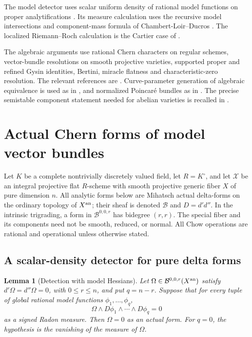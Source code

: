 \documentclass[11pt]{article}
\newtheorem{lemma}[theorem]{Lemma}
\theoremstyle{definition}
\theoremstyle{remark}
\numberwithin{equation}{section}
\begin{document}
The model detector uses scalar uniform density of rational model functions on proper analytifications \cite[Proposition 2.15]{GM}. Its measure calculation uses the recursive model intersections and component-mass formula of Chambert-Loir--Ducros \cite[Sections 8.7--8.8 and Theorem 18.5.5]{CLD}. The localized Riemann--Roch calculation is the Cartier case of \cite[Corollary 18.1.2]{Fulton}.

The algebraic arguments use rational Chern characters on regular schemes, vector-bundle resolutions on smooth projective varieties, supported proper and refined Gysin identities, Bertini, miracle flatness and characteristic-zero resolution. The relevant references are \cite{Stacks,StacksFEY,StacksFEW,StacksGysin}. Curve-parameter generation of algebraic equivalence is used as in \cite{ACMV}, and normalized Poincar\'e bundles as in \cite{MilneJV}. The precise semistable component statement needed for abelian varieties is recalled in .


\section{Actual Chern forms of model vector bundles}
\label{r10c:section}

Let $K$ be a complete nontrivially discretely valued field, let
$R=K^\circ$, and let $\mathcal X$ be an integral projective flat
$R$-scheme with smooth projective generic fiber $X$ of pure dimension $n$.
All analytic forms below are Mihatsch actual delta-forms on the ordinary
topology of $X^{\rm an}$; their sheaf is denoted $\mathcal B$ and
$D=d'd''$.  In the intrinsic trigrading, a form in
$\mathcal B^{0,0,r}$ has bidegree $(r,r)$.
The special fiber and its components need not be smooth, reduced, or
normal.  All Chow operations are rational and operational unless
otherwise stated.

\subsection{A scalar-density detector for pure delta forms}

\begin{lemma}[Detection with model Hessians]
\label{r10c:detector}
Let $\Omega\in\mathcal B^{0,0,r}(X^{\rm an})$ satisfy
$d'\Omega=d''\Omega=0$, with $0\leq r\leq n$, and put $q=n-r$.  Suppose that for every
tuple of global rational model functions $\phi_1,\ldots,\phi_q$,
\[
                 \Omega\wedge D\phi_1\wedge\cdots\wedge D\phi_q=0
\]
as a signed Radon measure.  Then $\Omega=0$ as an actual form.
For $q=0$, the hypothesis is the vanishing of the measure of $\Omega$.
\end{lemma}
\end{document}
